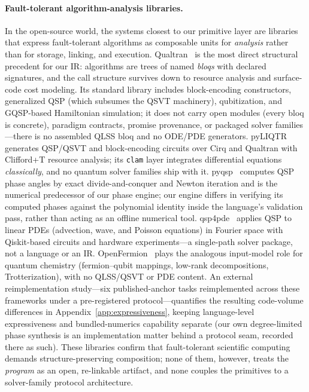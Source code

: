 \paragraph{Fault-tolerant algorithm-analysis libraries.}
In the open-source world, the systems closest to our primitive layer are
libraries that express fault-tolerant algorithms as composable units for
\emph{analysis} rather than for storage, linking, and execution.
Qualtran~\cite{harrigan2024qualtran} is the most direct structural
precedent for our IR: algorithms are trees of named \emph{bloqs} with
declared signatures, and the call structure survives down to resource
analysis and surface-code cost modeling.  Its standard library includes
block-encoding constructors, generalized QSP (which subsumes the QSVT
machinery), qubitization, and GQSP-based Hamiltonian simulation; it does
not carry open modules (every bloq is concrete), paradigm contracts,
promise provenance, or packaged solver families---there is no assembled
QLSS bloq and no ODE/PDE generators.
pyLIQTR~\cite{obenland2026pyliqtr} generates QSP/QSVT and block-encoding
circuits over Cirq and Qualtran with Clifford+T resource analysis; its
\texttt{clam} layer integrates differential equations \emph{classically},
and no quantum solver families ship with it.
pyqsp~\cite{chuang2021pyqsp} computes QSP phase angles by exact
divide-and-conquer and Newton iteration and is the numerical predecessor
of our phase engine; our engine differs in verifying its computed phases
against the polynomial identity inside the language's validation pass,
rather than acting as an offline numerical tool.
qsp4pde~\cite{kim2026qsp4pde} applies QSP to linear PDEs (advection,
wave, and Poisson equations) in Fourier space with Qiskit-based circuits
and hardware experiments---a single-path solver package, not a language
or an IR.
OpenFermion~\cite{mcclean2020openfermion} plays the analogous input-model
role for quantum chemistry (fermion--qubit mappings, low-rank
decompositions, Trotterization), with no QLSS/QSVT or PDE content.
An external reimplementation study---six published-anchor tasks
reimplemented across these frameworks under a pre-registered
protocol---quantifies the resulting code-volume differences in
Appendix~\ref{app:expressiveness}, keeping language-level expressiveness
and bundled-numerics capability separate (our own degree-limited phase
synthesis is an implementation matter behind a protocol seam, recorded
there as such).
These libraries confirm that fault-tolerant scientific computing demands
structure-preserving composition; none of them, however, treats the
\emph{program} as an open, re-linkable artifact, and none couples the
primitives to a solver-family protocol architecture.

